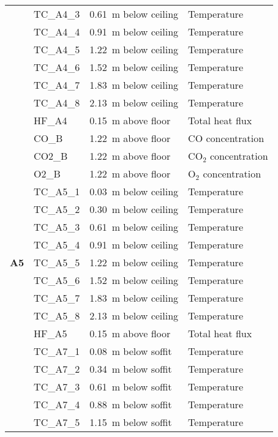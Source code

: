 \begin{longtable}[c]{c|lll}
 & TC\_A4\_3  & 0.61~m below ceiling & Temperature \\
 & TC\_A4\_4  & 0.91~m below ceiling & Temperature \\
 & TC\_A4\_5  & 1.22~m below ceiling & Temperature \\
 & TC\_A4\_6  & 1.52~m below ceiling & Temperature \\
 & TC\_A4\_7  & 1.83~m below ceiling & Temperature \\
 & TC\_A4\_8  & 2.13~m below ceiling & Temperature \\
\cline{2-4}
 & HF\_A4	  & 0.15~m above floor   & Total heat flux \\
\cline{2-4}
 & CO\_B      & 1.22~m above floor   & CO concentration \\
 & CO2\_B     & 1.22~m above floor   & CO$_2$ concentration \\
 & O2\_B      & 1.22~m above floor   & O$_2$ concentration \\
\midrule
\multirow{9}{*}{\large{\textbf{A5}}}
 & TC\_A5\_1  & 0.03~m below ceiling & Temperature \\
 & TC\_A5\_2  & 0.30~m below ceiling & Temperature \\
 & TC\_A5\_3  & 0.61~m below ceiling & Temperature \\
 & TC\_A5\_4  & 0.91~m below ceiling & Temperature \\
 & TC\_A5\_5  & 1.22~m below ceiling & Temperature \\
 & TC\_A5\_6  & 1.52~m below ceiling & Temperature \\
 & TC\_A5\_7  & 1.83~m below ceiling & Temperature \\
 & TC\_A5\_8  & 2.13~m below ceiling & Temperature \\
\cline{2-4}
 & HF\_A5	  & 0.15~m above floor   & Total heat flux \\
\bottomrule
\newpage
\multirow{16}{*}{\large{\textbf{A7}}}
 & TC\_A7\_1  & 0.08~m below soffit  & Temperature \\
 & TC\_A7\_2  & 0.34~m below soffit  & Temperature \\
 & TC\_A7\_3  & 0.61~m below soffit  & Temperature \\
 & TC\_A7\_4  & 0.88~m below soffit  & Temperature \\
 & TC\_A7\_5  & 1.15~m below soffit  & Temperature \\

\end{longtable}
